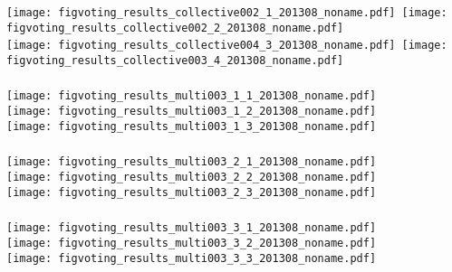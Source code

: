 \begin{frame}[plain]
  \frametitle{}

  \texttt{[image: figvoting\_results\_collective002\_1\_201308\_noname.pdf]}~\texttt{[image: figvoting\_results\_collective002\_2\_201308\_noname.pdf]}\\
  \texttt{[image: figvoting\_results\_collective004\_3\_201308\_noname.pdf]}~\texttt{[image: figvoting\_results\_collective003\_4\_201308\_noname.pdf]}


\end{frame}


\begin{frame}
  \frametitle{}

  \texttt{[image: figvoting\_results\_multi003\_1\_1\_201308\_noname.pdf]}\\
  \texttt{[image: figvoting\_results\_multi003\_1\_2\_201308\_noname.pdf]}\\
  \texttt{[image: figvoting\_results\_multi003\_1\_3\_201308\_noname.pdf]}

\end{frame}

\begin{frame}
  \frametitle{}

  \texttt{[image: figvoting\_results\_multi003\_2\_1\_201308\_noname.pdf]}\\
  \texttt{[image: figvoting\_results\_multi003\_2\_2\_201308\_noname.pdf]}\\
  \texttt{[image: figvoting\_results\_multi003\_2\_3\_201308\_noname.pdf]}

\end{frame}

\begin{frame}
  \frametitle{}

  \texttt{[image: figvoting\_results\_multi003\_3\_1\_201308\_noname.pdf]}\\
  \texttt{[image: figvoting\_results\_multi003\_3\_2\_201308\_noname.pdf]}\\
  \texttt{[image: figvoting\_results\_multi003\_3\_3\_201308\_noname.pdf]}

\end{frame}

